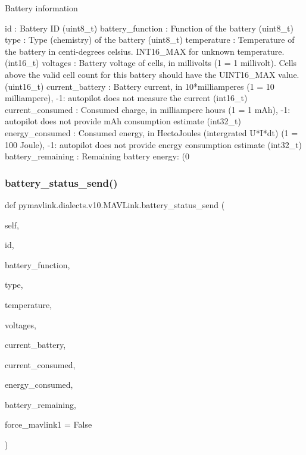 \begin{DoxyVerb}Battery information

id                        : Battery ID (uint8_t)
battery_function          : Function of the battery (uint8_t)
type                      : Type (chemistry) of the battery (uint8_t)
temperature               : Temperature of the battery in centi-degrees celsius. INT16_MAX for unknown temperature. (int16_t)
voltages                  : Battery voltage of cells, in millivolts (1 = 1 millivolt). Cells above the valid cell count for this battery should have the UINT16_MAX value. (uint16_t)
current_battery           : Battery current, in 10*milliamperes (1 = 10 milliampere), -1: autopilot does not measure the current (int16_t)
current_consumed          : Consumed charge, in milliampere hours (1 = 1 mAh), -1: autopilot does not provide mAh consumption estimate (int32_t)
energy_consumed           : Consumed energy, in HectoJoules (intergrated U*I*dt)  (1 = 100 Joule), -1: autopilot does not provide energy consumption estimate (int32_t)
battery_remaining         : Remaining battery energy: (0%
 \mbox{\label{classpymavlink_1_1dialects_1_1v10_1_1MAVLink_a5e24cb74a6c35aa9859ce52ca010381b}} 
\subsubsection{\texorpdfstring{battery\+\_\+status\+\_\+send()}{battery\_status\_send()}}
{\footnotesize\ttfamily def pymavlink.\+dialects.\+v10.\+M\+A\+V\+Link.\+battery\+\_\+status\+\_\+send (\begin{DoxyParamCaption}\item[{}]{self,  }\item[{}]{id,  }\item[{}]{battery\+\_\+function,  }\item[{}]{type,  }\item[{}]{temperature,  }\item[{}]{voltages,  }\item[{}]{current\+\_\+battery,  }\item[{}]{current\+\_\+consumed,  }\item[{}]{energy\+\_\+consumed,  }\item[{}]{battery\+\_\+remaining,  }\item[{}]{force\+\_\+mavlink1 = {\ttfamily False} }\end{DoxyParamCaption})}


\end{DoxyVerb}
